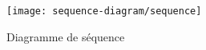 \begin{figure}[ht]
    \centering
    \caption{Diagramme de séquence}
    \texttt{[image: sequence-diagram/sequence]}
    \label{fig:sequence-diagram}
\end{figure}
\pagebreak